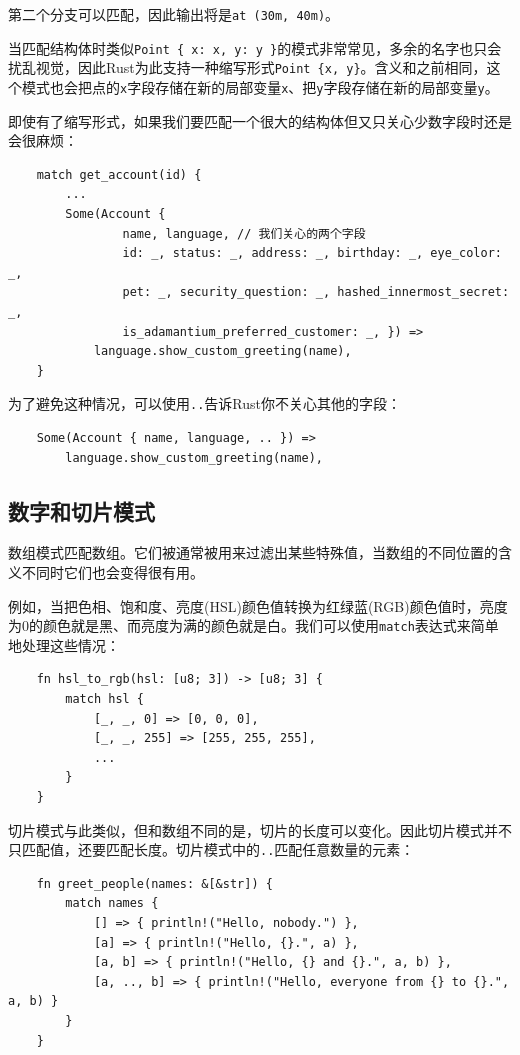 第二个分支可以匹配，因此输出将是\texttt{at (30m, 40m)}。

当匹配结构体时类似\texttt{Point \{ x: x, y: y \}}的模式非常常见，多余的名字也只会扰乱视觉，因此Rust为此支持一种缩写形式\texttt{Point \{x, y\}}。含义和之前相同，这个模式也会把点的\texttt{x}字段存储在新的局部变量\texttt{x}、把\texttt{y}字段存储在新的局部变量\texttt{y}。

即使有了缩写形式，如果我们要匹配一个很大的结构体但又只关心少数字段时还是会很麻烦：
\begin{verbatim}
    match get_account(id) {
        ...
        Some(Account {
                name, language, // 我们关心的两个字段
                id: _, status: _, address: _, birthday: _, eye_color: _,
                pet: _, security_question: _, hashed_innermost_secret: _,
                is_adamantium_preferred_customer: _, }) =>
            language.show_custom_greeting(name),
    }
\end{verbatim}

为了避免这种情况，可以使用\texttt{..}告诉Rust你不关心其他的字段：
\begin{verbatim}
    Some(Account { name, language, .. }) =>
        language.show_custom_greeting(name),
\end{verbatim}

\subsection{数字和切片模式}
数组模式匹配数组。它们被通常被用来过滤出某些特殊值，当数组的不同位置的含义不同时它们也会变得很有用。

例如，当把色相、饱和度、亮度(HSL)颜色值转换为红绿蓝(RGB)颜色值时，亮度为0的颜色就是黑、而亮度为满的颜色就是白。我们可以使用\texttt{match}表达式来简单地处理这些情况：
\begin{verbatim}
    fn hsl_to_rgb(hsl: [u8; 3]) -> [u8; 3] {
        match hsl {
            [_, _, 0] => [0, 0, 0],
            [_, _, 255] => [255, 255, 255],
            ...
        }
    }
\end{verbatim}

切片模式与此类似，但和数组不同的是，切片的长度可以变化。因此切片模式并不只匹配值，还要匹配长度。切片模式中的\texttt{..}匹配任意数量的元素：
\begin{verbatim}
    fn greet_people(names: &[&str]) {
        match names {
            [] => { println!("Hello, nobody.") },
            [a] => { println!("Hello, {}.", a) },
            [a, b] => { println!("Hello, {} and {}.", a, b) },
            [a, .., b] => { println!("Hello, everyone from {} to {}.", a, b) }
        }
    }
\end{verbatim}

